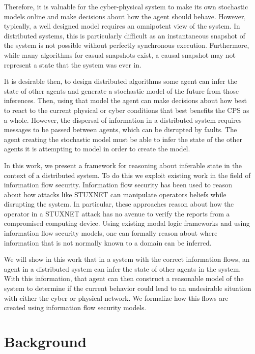 Therefore, it is valuable for the cyber-physical system to make its own stochastic models online and make decisions about how the agent should behave. However, typically, a well designed model requires an omnipotent view of the system. In distributed systems, this is particularly difficult as an instantaneous snapshot of the system is not possible without perfectly synchronous execution. Furthermore, while many algorithms for casual snapshots exist\cite{distributed-challenges}, a causal snapshot may not represent a state that the system was ever in.

It is desirable then, to design distributed algorithms some agent can infer the state of other agents and generate a stochastic model of the future from those inferences. Then, using that model the agent can make decisions about how best to react to the current physical or cyber conditions that best benefits the \ac{CPS} as a whole. However, the dispersal of information in a distributed system requires messages to be passed between agents, which can be disrupted by faults\cite{HARINI}. The agent creating the stochastic model must be able to infer the state of the other agents it is attempting to model in order to create the model.

In this work, we present a framework for reasoning about inferable state in the context of a distributed system. To do this we exploit existing work in the field of information flow security. Information flow security has been used to reason about how attacks like STUXNET can manipulate operators beliefs while disrupting the system\cite{STUXNET}. In particular, these approaches reason about how the operator in a STUXNET attack has no avenue to verify the reports from a compromised computing device. Using existing modal logic frameworks and using information flow security models\cite{Howser2012}\cite{STUXNET}\cite{Howser2013}, one can formally reason about where information that is not normally known to a domain can be inferred.

We will show in this work that in a system with the correct information flows, an agent in a distributed system can infer the state of other agents in the system. With this information, that agent can then construct a reasonable model of the system to determine if the current behavior could lead to an undesirable situation with either the cyber or physical network. We formalize how this flows are created using information flow security models.

\section{Background}


